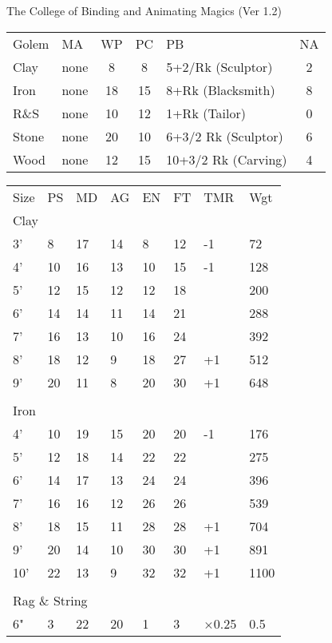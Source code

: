 \begin{Chapter}{The College of Binding and Animating Magics (Ver 1.2)}
\begin{small}
\begin{tabularx}{\columnwidth}{llccXc} \\
Golem	& MA	& WP	& PC	& PB			& NA \\
Clay	& none	& 8	& 8	& 5+2/Rk (Sculptor)	& 2 \\
Iron	& none	& 18	& 15	& 8+Rk (Blacksmith)	& 8 \\
R\&S	& none	& 10	& 12	& 1+Rk (Tailor)		& 0 \\
Stone	& none	& 20	& 10	& 6+3/2 Rk (Sculptor)	& 6 \\
Wood	& none	& 12	& 15	& 10+3/2 Rk (Carving)	& 4 \\
\end{tabularx} 
\end{small}

\begin{small}
\begin{tabularx}{\columnwidth}{llllllll}
Size	& PS	& MD	& AG	& EN	& FT	& TMR	& Wgt \\
\multicolumn{8}{l}{Clay} \\
3’	& 8	& 17	& 14	& 8	& 12	& -1	& 72 \\
4’	& 10	& 16	& 13	& 10	& 15	& -1	& 128 \\
5’	& 12	& 15	& 12	& 12	& 18	& 	& 200 \\
6’	& 14	& 14	& 11	& 14	& 21	& 	& 288 \\
7’	& 16	& 13	& 10	& 16	& 24	& 	& 392 \\
8’	& 18	& 12	& 9	& 18	& 27	& +1	& 512 \\
9’	& 20	& 11	& 8	& 20	& 30	& +1	& 648 \\
 	& 	& 	& 	& 	& 	& 	& \\
\multicolumn{8}{l}{Iron} \\
4’ 	& 10	& 19	& 15	& 20	& 20	& -1	& 176 \\
5’ 	& 12	& 18	& 14	& 22	& 22	& 	& 275 \\
6’ 	& 14	& 17	& 13	& 24	& 24	& 	& 396 \\
7’ 	& 16	& 16	& 12	& 26	& 26	& 	& 539 \\
8’ 	& 18	& 15	& 11	& 28	& 28	& +1	& 704 \\
9’ 	& 20	& 14	& 10	& 30	& 30	& +1	& 891 \\
10’ 	& 22	& 13	& 9	& 32	& 32	& +1	& 1100 \\
 	& 	& 	& 	& 	& 	& 	& \\
\multicolumn{8}{l}{Rag \& String} \\
6"	& 3	& 22	& 20	& 1	& 3	& ×0.25	& 0.5 \\

\end{tabularx}
\end{small}
\end{Chapter}
